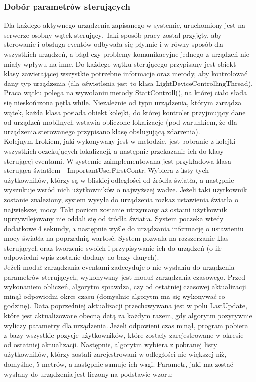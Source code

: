 \subsubsection{Dobór parametrów sterujących}
Dla każdego aktywnego urządzenia zapisanego w systemie, uruchomiony jest na serwerze osobny wątek sterujący. Taki sposób pracy został przyjęty, aby sterowanie i obsługa eventów odbywała się płynnie i w równy sposób dla wszystkich urządzeń, a błąd czy problemy komunikacyjne jednego z urządzeń nie miały wpływu na inne. Do każdego wątku sterującego przypisany jest obiekt klasy zawierającej wszystkie potrzebne informacje oraz metody, aby kontrolować dany typ urządzenia (dla oświetlenia jest to klasa LightDeviceControllingThread).\\
Praca wątku polega na wywołaniu metody StartControll(), na której ciało słada się nieskończona pętla while. Niezależnie od typu urządzenia, którym zarządza wątek, każda klasa posiada obiekt kolejki, do której kontroler przyjmujący dane od urządzeń mobilnych wstawia obliczone lokalizacje (pod warunkiem, że dla urządzenia sterowanego przypisano klasę obsługującą zdarzenia).\\
Kolejnym krokiem, jaki wykonywany jest w metodzie, jest pobranie z kolejki wszystkich oczekujących lokalizacji, a następnie przekazanie ich do klasy sterującej eventami. W systemie zaimplementowana jest przykładowa klasa sterująca światłem - ImportantUserFirstContr. Wybiera z listy tych użytkowników, którzy są w bliskiej odległości od źródła światła, a następnie wyszukuje wsród nich użytkowników o najwyższej wadze. Jeżeli taki użytkownik zostanie znaleziony, system wysyła do urządzenia rozkaz ustawienia światła o największej mocy. Taki poziom zostanie utrzymany aż ostatni użytkownik uprzywilejowany nie oddali się od źródła światła. System poczeka wtedy dodatkowe 4 sekundy, a następnie wyśle do urządzania informację o ustawieniu mocy światła na poprzednią wartość. System pozwala na rozszerzanie klas sterujących oraz tworzenie swoich i przypisywanie ich do urządzeń (o ile odpowiedni wpis zostanie dodany do bazy danych).\\
Jeżeli moduł zarządzania eventami zadecyduje o nie wysłaniu do urządzenia parametrów sterujących, wykonywany jest moduł zarządzania czasowego. Przed wykonaniem obliczeń, algorytm sprawdza, czy od ostatniej czasowej aktualizacji minął odpowiedni okres czasu (domyslnie algorytm ma się wykonywać co godzinę). Data poprzedniej aktualizacji przechowywana jest w polu LastUpdate, które jest aktualizowane obecną datą za każdym razem, gdy algorytm pozytywnie wyliczy parametry dla urządzenia. Jeżeli odpowieni czas minął, program pobiera z bazy wszystkie pozycje użytkowników, które zostały zarejestrowane w okresie od ostatniej aktualizacji. Następnie, algorytm wybiera z pobranej listy użytkowników, którzy zostali zarejestrowani w odległości nie większej niż, domyślne, 5 metrów, a następnie sumuje ich wagi. Parametr, jaki ma zostać wysłany do urządzenia jest liczony na podstawie wzoru:
